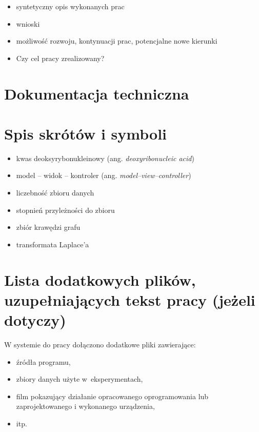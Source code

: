 \documentclass[a4paper,twoside,12pt]{book}
\newcommand{\obcy}[1]{\emph{#1}}
\newcommand{\english}[1]{{\selectlanguage{british}\obcy{#1}}}
\begin{document}
	\begin{itemize}
		\item syntetyczny opis wykonanych prac
		\item wnioski
		\item możliwość rozwoju, kontynuacji prac, potencjalne nowe kierunki
		\item Czy cel pracy zrealizowany? 
	\end{itemize}
	
	
	
	\backmatter
	
	\cleardoublepage
	\printbibliography           %
	
	\begin{appendices}
		
		\chapter{Dokumentacja techniczna}
		
		
		\chapter{Spis skrótów i symboli}
		
		\begin{itemize}
			\item[DNA] kwas deoksyrybonukleinowy (ang. \english{deoxyribonucleic acid})
			\item[MVC] model -- widok -- kontroler (ang. \english{model--view--controller}) 
			\item[$N$] liczebność zbioru danych
			\item[$\mu$] stopnień przyleżności do zbioru
			\item[$\mathbb{E}$] zbiór krawędzi grafu
			\item[$\mathcal{L}$] transformata Laplace'a 
		\end{itemize}
		
		\chapter{Lista dodatkowych plików, uzupełniających tekst pracy (jeżeli dotyczy)} 
		
		W systemie do pracy dołączono dodatkowe pliki zawierające:
		\begin{itemize}
			\item źródła programu,
			\item zbiory danych użyte w~eksperymentach,
			\item film pokazujący działanie opracowanego oprogramowania lub zaprojektowanego i wykonanego urządzenia,
			\item itp.
		\end{itemize}
		
		
		\listoffigures
		\listoftables
		
	\end{appendices}
	
\end{document}
